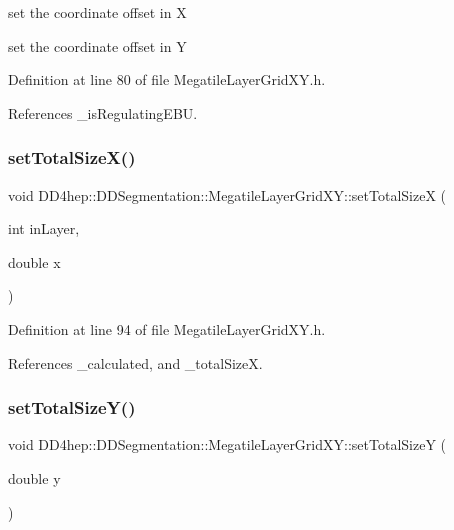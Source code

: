 set the coordinate offset in X 

set the coordinate offset in Y 

Definition at line 80 of file Megatile\+Layer\+Grid\+X\+Y.\+h.



References \+\_\+is\+Regulating\+E\+BU.

\hypertarget{class_d_d4hep_1_1_d_d_segmentation_1_1_megatile_layer_grid_x_y_a280c3a98334f9c11ceb580d27b03bf70}{}\label{class_d_d4hep_1_1_d_d_segmentation_1_1_megatile_layer_grid_x_y_a280c3a98334f9c11ceb580d27b03bf70} 
\subsubsection{\texorpdfstring{set\+Total\+Size\+X()}{setTotalSizeX()}}
{\footnotesize\ttfamily void D\+D4hep\+::\+D\+D\+Segmentation\+::\+Megatile\+Layer\+Grid\+X\+Y\+::set\+Total\+SizeX (\begin{DoxyParamCaption}\item[{int}]{in\+Layer,  }\item[{double}]{x }\end{DoxyParamCaption})\hspace{0.3cm}{\ttfamily [inline]}}



Definition at line 94 of file Megatile\+Layer\+Grid\+X\+Y.\+h.



References \+\_\+calculated, and \+\_\+total\+SizeX.

\hypertarget{class_d_d4hep_1_1_d_d_segmentation_1_1_megatile_layer_grid_x_y_ae87f5055295fe08dc28352c996bd9a0f}{}\label{class_d_d4hep_1_1_d_d_segmentation_1_1_megatile_layer_grid_x_y_ae87f5055295fe08dc28352c996bd9a0f} 
\subsubsection{\texorpdfstring{set\+Total\+Size\+Y()}{setTotalSizeY()}}
{\footnotesize\ttfamily void D\+D4hep\+::\+D\+D\+Segmentation\+::\+Megatile\+Layer\+Grid\+X\+Y\+::set\+Total\+SizeY (\begin{DoxyParamCaption}\item[{double}]{y }\end{DoxyParamCaption})\hspace{0.3cm}{\ttfamily [inline]}}



